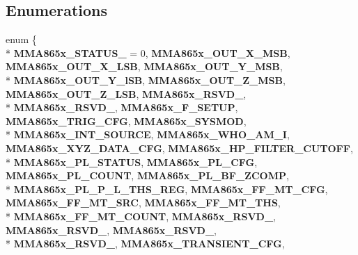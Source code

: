 \subsection*{Enumerations}
\begin{DoxyCompactItemize}
\item 
\hypertarget{group___engduino_accelerometer_ga06fc87d81c62e9abb8790b6e5713c55b}{}enum \{ \\*
{\bfseries M\+M\+A865x\+\_\+\+S\+T\+A\+T\+U\+S\+\_} = 0, 
{\bfseries M\+M\+A865x\+\_\+\+O\+U\+T\+\_\+\+X\+\_\+\+M\+S\+B}, 
{\bfseries M\+M\+A865x\+\_\+\+O\+U\+T\+\_\+\+X\+\_\+\+L\+S\+B}, 
{\bfseries M\+M\+A865x\+\_\+\+O\+U\+T\+\_\+\+Y\+\_\+\+M\+S\+B}, 
\\*
{\bfseries M\+M\+A865x\+\_\+\+O\+U\+T\+\_\+\+Y\+\_\+l\+S\+B}, 
{\bfseries M\+M\+A865x\+\_\+\+O\+U\+T\+\_\+\+Z\+\_\+\+M\+S\+B}, 
{\bfseries M\+M\+A865x\+\_\+\+O\+U\+T\+\_\+\+Z\+\_\+\+L\+S\+B}, 
{\bfseries M\+M\+A865x\+\_\+\+R\+S\+V\+D\+\_}, 
\\*
{\bfseries M\+M\+A865x\+\_\+\+R\+S\+V\+D\+\_}, 
{\bfseries M\+M\+A865x\+\_\+\+F\+\_\+\+S\+E\+T\+U\+P}, 
{\bfseries M\+M\+A865x\+\_\+\+T\+R\+I\+G\+\_\+\+C\+F\+G}, 
{\bfseries M\+M\+A865x\+\_\+\+S\+Y\+S\+M\+O\+D}, 
\\*
{\bfseries M\+M\+A865x\+\_\+\+I\+N\+T\+\_\+\+S\+O\+U\+R\+C\+E}, 
{\bfseries M\+M\+A865x\+\_\+\+W\+H\+O\+\_\+\+A\+M\+\_\+\+I}, 
{\bfseries M\+M\+A865x\+\_\+\+X\+Y\+Z\+\_\+\+D\+A\+T\+A\+\_\+\+C\+F\+G}, 
{\bfseries M\+M\+A865x\+\_\+\+H\+P\+\_\+\+F\+I\+L\+T\+E\+R\+\_\+\+C\+U\+T\+O\+F\+F}, 
\\*
{\bfseries M\+M\+A865x\+\_\+\+P\+L\+\_\+\+S\+T\+A\+T\+U\+S}, 
{\bfseries M\+M\+A865x\+\_\+\+P\+L\+\_\+\+C\+F\+G}, 
{\bfseries M\+M\+A865x\+\_\+\+P\+L\+\_\+\+C\+O\+U\+N\+T}, 
{\bfseries M\+M\+A865x\+\_\+\+P\+L\+\_\+\+B\+F\+\_\+\+Z\+C\+O\+M\+P}, 
\\*
{\bfseries M\+M\+A865x\+\_\+\+P\+L\+\_\+\+P\+\_\+\+L\+\_\+\+T\+H\+S\+\_\+\+R\+E\+G}, 
{\bfseries M\+M\+A865x\+\_\+\+F\+F\+\_\+\+M\+T\+\_\+\+C\+F\+G}, 
{\bfseries M\+M\+A865x\+\_\+\+F\+F\+\_\+\+M\+T\+\_\+\+S\+R\+C}, 
{\bfseries M\+M\+A865x\+\_\+\+F\+F\+\_\+\+M\+T\+\_\+\+T\+H\+S}, 
\\*
{\bfseries M\+M\+A865x\+\_\+\+F\+F\+\_\+\+M\+T\+\_\+\+C\+O\+U\+N\+T}, 
{\bfseries M\+M\+A865x\+\_\+\+R\+S\+V\+D\+\_}, 
{\bfseries M\+M\+A865x\+\_\+\+R\+S\+V\+D\+\_}, 
{\bfseries M\+M\+A865x\+\_\+\+R\+S\+V\+D\+\_}, 
\\*
{\bfseries M\+M\+A865x\+\_\+\+R\+S\+V\+D\+\_}, 
{\bfseries M\+M\+A865x\+\_\+\+T\+R\+A\+N\+S\+I\+E\+N\+T\+\_\+\+C\+F\+G}, 

\end{DoxyCompactItemize}
